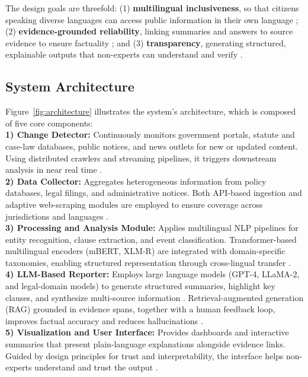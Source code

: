 {The design goals are threefold: (1) \textbf{multilingual inclusiveness}, so that citizens speaking diverse languages can access public information in their own language \cite{conneau2020xlmr, xue2021mt5}; (2) \textbf{evidence-grounded reliability}, linking summaries and answers to source evidence to ensure factuality \cite{lewis2020rag, maynez2020faithfulness}; and (3) \textbf{transparency}, generating structured, explainable outputs that non-experts can understand and verify \cite{mitchell2021modelcards}.


\subsection{System Architecture}
Figure~\ref{fig:architecture} illustrates the system's architecture, which is composed of five core components:
~\\
\textbf{1) Change Detector:} Continuously monitors government portals, statute and case-law databases, public notices, and news outlets for new or updated content. Using distributed crawlers and streaming pipelines, it triggers downstream analysis in near real time \cite{gama2014drift, niklaus2023multilegal}.
~\\
\textbf{2) Data Collector:} Aggregates heterogeneous information from policy databases, legal filings, and administrative notices. Both API-based ingestion and adaptive web-scraping modules are employed to ensure coverage across jurisdictions and languages \cite{nllb2022}.
~\\
\textbf{3) Processing and Analysis Module:} Applies multilingual NLP pipelines for entity recognition, clause extraction, and event classification. Transformer-based multilingual encoders (mBERT, XLM-R) are integrated with domain-specific taxonomies, enabling structured representation through cross-lingual transfer \cite{devlin2019bert, conneau2020xlmr}.
~\\
\textbf{4) LLM-Based Reporter:} Employs large language models (GPT-4, LLaMA-2, and legal-domain models) to generate structured summaries, highlight key clauses, and synthesize multi-source information \cite{openai2023gpt4, touvron2023llama2}. Retrieval-augmented generation (RAG) grounded in evidence spans, together with a human feedback loop, improves factual accuracy and reduces hallucinations \cite{lewis2020rag, ji2023hallucination}.
~\\
\textbf{5) Visualization and User Interface:} Provides dashboards and interactive summaries that present plain-language explanations alongside evidence links. Guided by design principles for trust and interpretability, the interface helps non-experts understand and trust the output \cite{mitchell2021modelcards, ouyang2022instructgpt}.

}
